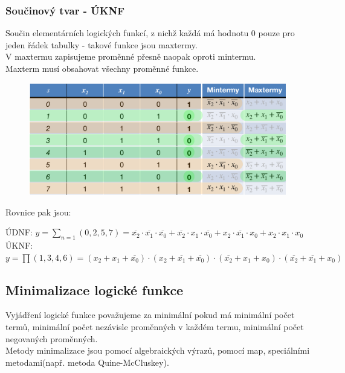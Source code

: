 \subsubsection{Součinový tvar - ÚKNF}
Součin elementárních logických funkcí, z nichž každá má hodnotu 0 pouze pro jeden řádek tabulky - takové funkce jsou maxtermy.\\
V maxtermu zapisujeme proměnné přesně naopak oproti mintermu.\\
Maxterm musí obsahovat všechny proměnné funkce.\\
\newpage
\begin{figure}
    \centering
    \includegraphics*[scale = 0.4]{img/Tvary.png}
\end{figure}
Rovnice pak jsou:
\begin{center}
    ÚDNF: \(y=\sum_{n = 1}(0,2,5,7)= \overline{x_2} \cdot \overline{x_1} \cdot \overline{x_0} + \overline{x_2} \cdot x_1 \cdot \overline{x_0} + x_2 \cdot \overline{x_1} \cdot x_0 + x_2 \cdot x_1 \cdot x_0 \)\\
    ÚKNF: \(y = \prod (1,3,4,6) = (x_2 + x_1 + \overline{x_0}) \cdot (x_2 + \overline{x_1} + \overline{x_0}) \cdot (\overline{x_2} + x_1 + x_0) \cdot (\overline{x_2} + \overline{x_1} + x_0)\)
\end{center}
\subsection{Minimalizace logické funkce}
Vyjádření logické funkce považujeme za minimální pokud má minimální počet termů, minimální počet nezávisle proměnných v každém termu, minimální počet negovaných proměnných.\\
Metody minimalizace jsou pomocí algebraických výrazů, pomocí map, speciálními metodami(např. metoda Quine-McCluskey).\\
